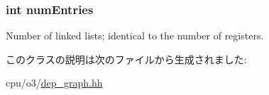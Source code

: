 \label{classDependencyGraph_a3872e5bf089b4615d62a04b097795a6e}
\hypertarget{classDependencyGraph_a75b15f0e26b4ccf3195772b134b660ec}{
\subsubsection[{numEntries}]{\setlength{\rightskip}{0pt plus 5cm}int {\bf numEntries}}}
\label{classDependencyGraph_a75b15f0e26b4ccf3195772b134b660ec}
Number of linked lists; identical to the number of registers. 

このクラスの説明は次のファイルから生成されました:\begin{DoxyCompactItemize}
\item 
cpu/o3/\hyperlink{dep__graph_8hh}{dep\_\-graph.hh}\end{DoxyCompactItemize}

